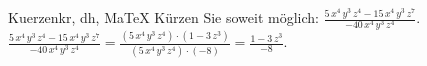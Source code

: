 \begin{MAufgabe}{Kuerzen}{kr, dh, MaTeX}
K\"urzen Sie soweit m\"oglich: $\frac{5\, x^4\, y^3\, z^4 - 15\, x^4\, y^3\, z^7}{- 40\, x^4\, y^3\, z^4}$.\\ 
\ifLsg\MLoesung
\quad $\frac{5\, x^4\, y^3\, z^4 - 15\, x^4\, y^3\, z^7}{- 40\, x^4\, y^3\, z^4}=\frac{(5\, x^4\, y^3\, z^4)\cdot(1 - 3\, z^3)}{(5\, x^4\, y^3\, z^4)\cdot(-8)}=\frac{1 - 3\, z^3}{-8}$.\else\relax\fi
 \end{MAufgabe}
